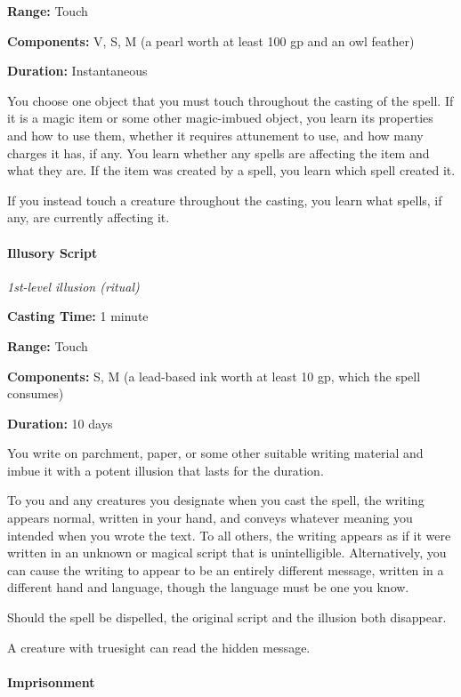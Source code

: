 \documentclass[
]{article}
\begin{document}
\textbf{Range:} Touch

\textbf{Components:} V, S, M (a pearl worth at least 100 gp and an owl
feather)

\textbf{Duration:} Instantaneous

You choose one object that you must touch throughout the casting of the
spell. If it is a magic item or some other magic-imbued object, you
learn its properties and how to use them, whether it requires attunement
to use, and how many charges it has, if any. You learn whether any
spells are affecting the item and what they are. If the item was created
by a spell, you learn which spell created it.

If you instead touch a creature throughout the casting, you learn what
spells, if any, are currently affecting it.

\hypertarget{illusory-script}{%
\paragraph{Illusory Script}\label{illusory-script}}

\emph{1st-level illusion (ritual)}

\textbf{Casting Time:} 1 minute

\textbf{Range:} Touch

\textbf{Components:} S, M (a lead-based ink worth at least 10 gp, which
the spell consumes)

\textbf{Duration:} 10 days

You write on parchment, paper, or some other suitable writing material
and imbue it with a potent illusion that lasts for the duration.

To you and any creatures you designate when you cast the spell, the
writing appears normal, written in your hand, and conveys whatever
meaning you intended when you wrote the text. To all others, the writing
appears as if it were written in an unknown or magical script that is
unintelligible. Alternatively, you can cause the writing to appear to be
an entirely different message, written in a different hand and language,
though the language must be one you know.

Should the spell be dispelled, the original script and the illusion both
disappear.

A creature with truesight can read the hidden message.

\hypertarget{imprisonment}{%
\paragraph{Imprisonment}\label{imprisonment}}
\end{document}
